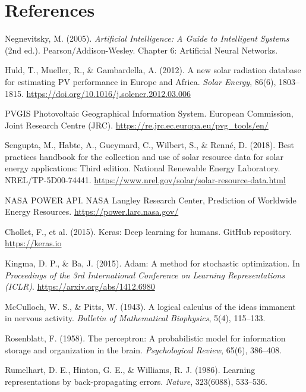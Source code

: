 \documentclass[11pt, a4paper]{article}
\begin{document}
\section*{References}

\begin{enumerate}[label={[\arabic*]}, leftmargin=*, itemsep=0.5em]

\item Negnevitsky, M. (2005). \textit{Artificial Intelligence: A Guide to
Intelligent Systems} (2nd ed.). Pearson/Addison-Wesley. Chapter 6:
Artificial Neural Networks.

\item Huld, T., Mueller, R., \& Gambardella, A. (2012). A new solar
radiation database for estimating PV performance in Europe and Africa.
\textit{Solar Energy}, 86(6), 1803--1815.
\url{https://doi.org/10.1016/j.solener.2012.03.006}

\item PVGIS Photovoltaic Geographical Information System. European
Commission, Joint Research Centre (JRC).
\url{https://re.jrc.ec.europa.eu/pvg_tools/en/}

\item Sengupta, M., Habte, A., Gueymard, C., Wilbert, S., \& Renn\'e, D.
(2018). Best practices handbook for the collection and use of solar
resource data for solar energy applications: Third edition. National
Renewable Energy Laboratory. NREL/TP-5D00-74441.
\url{https://www.nrel.gov/solar/solar-resource-data.html}

\item NASA POWER API. NASA Langley Research Center, Prediction of
Worldwide Energy Resources.
\url{https://power.larc.nasa.gov/}

\item Chollet, F., et al. (2015). Keras: Deep learning for humans.
GitHub repository. \url{https://keras.io}

\item Kingma, D. P., \& Ba, J. (2015). Adam: A method for stochastic
optimization. In \textit{Proceedings of the 3rd International Conference
on Learning Representations (ICLR)}. \url{https://arxiv.org/abs/1412.6980}

\item McCulloch, W. S., \& Pitts, W. (1943). A logical calculus of the
ideas immanent in nervous activity. \textit{Bulletin of Mathematical
Biophysics}, 5(4), 115--133.

\item Rosenblatt, F. (1958). The perceptron: A probabilistic model for
information storage and organization in the brain. \textit{Psychological
Review}, 65(6), 386--408.

\item Rumelhart, D. E., Hinton, G. E., \& Williams, R. J. (1986).
Learning representations by back-propagating errors. \textit{Nature},
323(6088), 533--536.

\end{enumerate}
\end{document}
